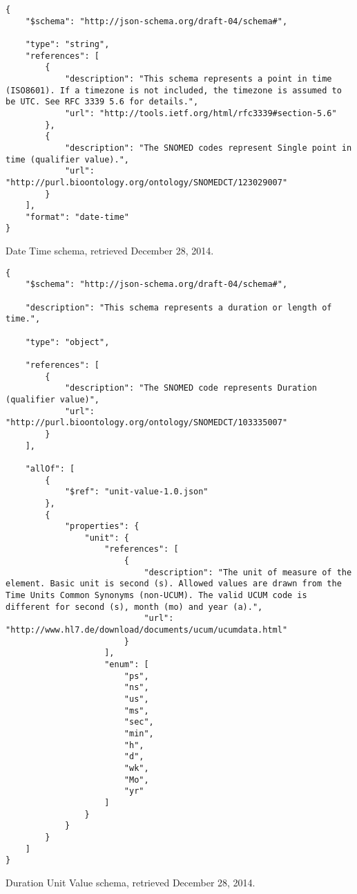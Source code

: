
\begin{listing}
\begin{verbatim}
{
    "$schema": "http://json-schema.org/draft-04/schema#",

    "type": "string",
    "references": [
        {
            "description": "This schema represents a point in time (ISO8601). If a timezone is not included, the timezone is assumed to be UTC. See RFC 3339 5.6 for details.",
            "url": "http://tools.ietf.org/html/rfc3339#section-5.6"
        },
        {
            "description": "The SNOMED codes represent Single point in time (qualifier value).",
            "url": "http://purl.bioontology.org/ontology/SNOMEDCT/123029007"
        }
    ],
    "format": "date-time"
}
\end{verbatim}
\caption{Date Time schema, retrieved December 28, 2014.} 
\label{listing:date-time-json}
\end{listing}



\begin{listing}
\begin{verbatim}
{
    "$schema": "http://json-schema.org/draft-04/schema#",

    "description": "This schema represents a duration or length of time.",

    "type": "object",

    "references": [
        {
            "description": "The SNOMED code represents Duration (qualifier value)",
            "url": "http://purl.bioontology.org/ontology/SNOMEDCT/103335007"
        }
    ],

    "allOf": [
        {
            "$ref": "unit-value-1.0.json"
        },
        {
            "properties": {
                "unit": {
                    "references": [
                        {
                            "description": "The unit of measure of the element. Basic unit is second (s). Allowed values are drawn from the Time Units Common Synonyms (non-UCUM). The valid UCUM code is different for second (s), month (mo) and year (a).",
                            "url": "http://www.hl7.de/download/documents/ucum/ucumdata.html"
                        }
                    ],
                    "enum": [
                        "ps",
                        "ns",
                        "us",
                        "ms",
                        "sec",
                        "min",
                        "h",
                        "d",
                        "wk",
                        "Mo",
                        "yr"
                    ]
                }
            }
        }
    ]
}
\end{verbatim}
\caption{Duration Unit Value schema, retrieved December 28, 2014.} 
\label{listing:duration-unit-value-json}
\end{listing}

